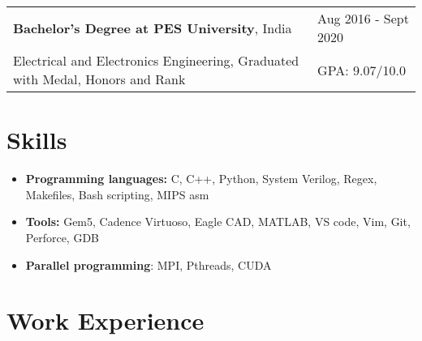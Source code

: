 \documentclass[a4paper,10pt]{article}
\begin{document}
\begin{tabularx}{\linewidth}{ @{}l X@{} }
    \textbf{Bachelor's Degree at PES University}, India & \hfill {\small Aug 2016 - Sept 2020} \\[2.75pt]
    {\small Electrical and Electronics Engineering, Graduated with Medal, Honors and Rank} & \hfill {\small GPA: 9.07/10.0}
\end{tabularx}

\section{Skills}

\begin{minipage}[t]{\linewidth}
    \begin{itemize}[nosep, leftmargin=2em, itemsep=3pt]
        \item \textbf{Programming languages:} C, C++, Python, System Verilog, Regex, Makefiles, Bash scripting, MIPS asm
        \item \textbf{Tools:} Gem5, Cadence Virtuoso, Eagle CAD, MATLAB, VS code, Vim, Git, Perforce, GDB
        \item \textbf{Parallel programming}: MPI, Pthreads, CUDA
    \end{itemize}
\end{minipage} 

\section{Work Experience}
\end{document}
